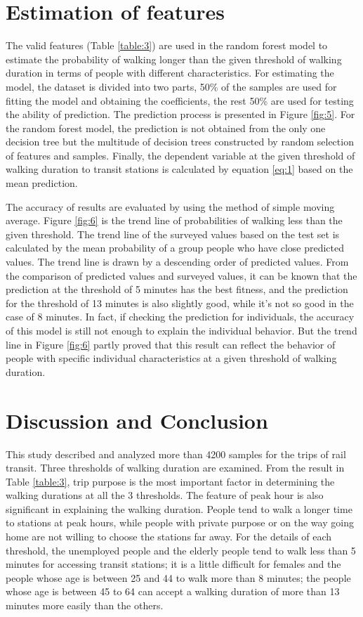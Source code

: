 \documentclass[Journal,letterpaper]{ascelike-new}
\begin{document}
%
\section{Estimation of features}
The valid features (Table \ref{table:3}) are used in the random forest model to estimate the probability of walking longer than the given threshold of walking duration in terms of people with different characteristics. For estimating the model, the dataset is divided into two parts, 50\% of the samples are used for fitting the model and obtaining the coefficients, the rest 50\% are used for testing the ability of prediction. The prediction process is presented in Figure \ref{fig:5}. For the random forest model, the prediction is not obtained from the only one decision tree but the multitude of decision trees constructed by random selection of features and samples. Finally, the dependent variable at the given threshold of walking duration to transit stations is calculated by equation \ref{eq:1} based on the mean prediction.

%
The accuracy of results are evaluated by using the method of simple moving average. Figure \ref{fig:6} is the trend line of probabilities of walking less than the given threshold. The trend line of the surveyed values based on the test set is calculated by the mean probability of a group people who have close predicted values. The trend line is drawn by a descending order of predicted values. From the comparison of predicted values and surveyed values, it can be known that the prediction at the threshold of 5 minutes has the best fitness, and the prediction for the threshold of 13 minutes is also slightly good, while it’s not so good in the case of 8 minutes. In fact, if checking the prediction for individuals, the accuracy of this model is still not enough to explain the individual behavior. But the trend line in Figure \ref{fig:6} partly proved that this result can reflect the behavior of people with specific individual characteristics at a given threshold of walking duration. 

%
\section{Discussion and Conclusion}
This study described and analyzed more than 4200 samples for the trips of rail transit. Three thresholds of walking duration are examined. From the result in Table \ref{table:3}, trip purpose is the most important factor in determining the walking durations at all the 3 thresholds. The feature of peak hour is also significant in explaining the walking duration. People tend to walk a longer time to stations at peak hours, while people with private purpose or on the way going home are not willing to choose the stations far away. For the details of each threshold, the unemployed people and the elderly people tend to walk less than 5 minutes for accessing transit stations; it is a little difficult for females and the people whose age is between 25 and 44 to walk more than 8 minutes; the people whose age is between 45 to 64 can accept a walking duration of more than 13 minutes more easily than the others.
\end{document}
